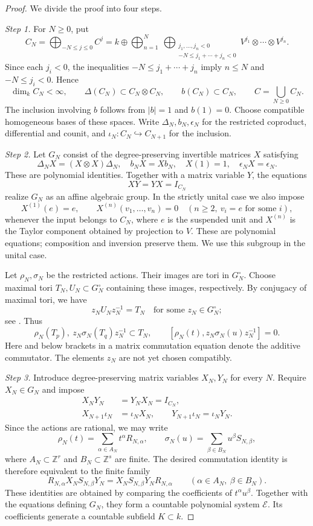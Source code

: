 \documentclass[12pt,a4paper,english,reqno]{amsart}
\theoremstyle{plain}
\theoremstyle{definition}
\numberwithin{equation}{section}
\def\al{\alpha}
\def\be{\beta}
\def\io{\iota}
\def\ro{\rho}
\def\si{\sigma}
\def\De{\Delta}
\def\bbZ{{\mathbb Z}}
\def\incl{\hookrightarrow}
\def\ds{\oplus}
\def\ox{\otimes}
\def\Ds{\bigoplus}
\begin{document}
\begin{proof}
We divide the proof into four steps.

\medskip\noindent\emph{Step 1.}
For $N\ge0$, put
\[
 C_N=\Ds_{-N\le j\le0}C^j
 =k\ds\Ds_{n=1}^{N}
 \ \Ds_{\substack{j_1,\ldots,j_n<0\\-N\le j_1+\cdots+j_n<0}}
 V^{j_1}\ox\cdots\ox V^{j_n}.
\]
Since each $j_i<0$, the inequalities $-N\le j_1+\cdots+j_n$ imply $n\le N$ and $-N\le j_i<0$. Hence
\[
 \dim_k C_N<\infty,\qquad
 \De(C_N)\subset C_N\ox C_N,\qquad
 b(C_N)\subset C_N,\qquad C=\bigcup_{N\ge0}C_N.
\]
The inclusion involving $b$ follows from $|b|=1$ and $b(1)=0$. Choose compatible homogeneous bases of these spaces. Write $\De_N,b_N,\epsilon_N$ for the restricted coproduct, differential and counit, and $\io_N:C_N\incl C_{N+1}$ for the inclusion.

\medskip\noindent\emph{Step 2.}
Let $G_N$ consist of the degree-preserving invertible matrices $X$ satisfying
\[
 \De_NX=(X\ox X)\De_N,\quad
 b_NX=Xb_N,\quad X(1)=1,\quad\epsilon_NX=\epsilon_N.
\]
These are polynomial identities. Together with a matrix variable $Y$, the equations
\[
 XY=YX=I_{C_N}
\]
realize $G_N$ as an affine algebraic group. In the strictly unital case we also impose
\[
 X^{(1)}(e)=e,\qquad
 X^{(n)}(v_1,\ldots,v_n)=0
 \quad(n\ge2,\ v_i=e\text{ for some }i),
\]
whenever the input belongs to $C_N$, where $e$ is the suspended unit and $X^{(n)}$ is the Taylor component obtained by projection to $V$. These are polynomial equations; composition and inversion preserve them. We use this subgroup in the unital case.

Let $\ro_N,\si_N$ be the restricted actions. Their images are tori in $G_N^\circ$. Choose maximal tori $T_N,U_N\subset G_N^\circ$ containing these images, respectively. By conjugacy of maximal tori, we have
\[
 z_NU_Nz_N^{-1}=T_N
 \quad\text{for some }z_N\in G_N^\circ;
\]
see \cite[Expos\'e XII, Theorem 6.6(a)]{SGA}. Thus
\[
 \ro_N(T_p),\ z_N\si_N(T_q)z_N^{-1}\subset T_N,
 \qquad
 [\ro_N(t),z_N\si_N(u)z_N^{-1}]=0.
\]
Here and below brackets in a matrix commutation equation denote the additive commutator. The elements $z_N$ are not yet chosen compatibly.

\medskip\noindent\emph{Step 3.}
Introduce degree-preserving matrix variables $X_N,Y_N$ for every $N$. Require $X_N\in G_N$ and impose
\[
 \begin{aligned}
 X_NY_N&=Y_NX_N=I_{C_N},\\
 X_{N+1}\io_N&=\io_NX_N,\qquad
 Y_{N+1}\io_N=\io_NY_N.
 \end{aligned}
\]
Since the actions are rational, we may write
\[
 \ro_N(t)=\sum_{\al\in A_N}t^\al R_{N,\al},\qquad
 \si_N(u)=\sum_{\be\in B_N}u^\be S_{N,\be},
\]
where $A_N\subset\bbZ^r$ and $B_N\subset\bbZ^s$ are finite. The desired commutation identity is therefore equivalent to the finite family
\[
 R_{N,\al}X_NS_{N,\be}Y_N
 =X_NS_{N,\be}Y_NR_{N,\al}
 \qquad(\al\in A_N,\ \be\in B_N).
\]
These identities are obtained by comparing the coefficients of $t^\al u^\be$. Together with the equations defining $G_N$, they form a countable polynomial system $\mathcal E$. Its coefficients generate a countable subfield $K\subset k$.


\end{proof}
\end{document}
